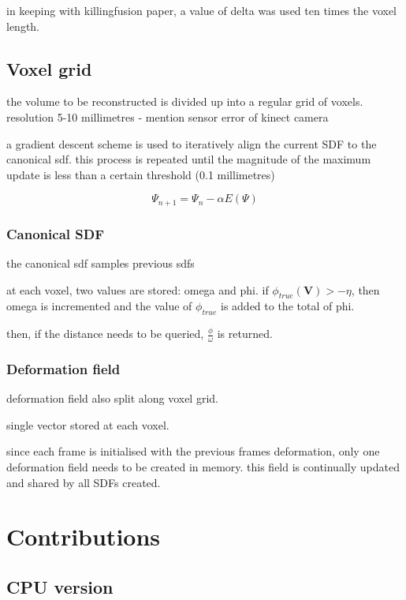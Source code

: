\documentclass[12pt,twoside]{report}
\begin{document}
in keeping with killingfusion paper, a value of delta was used ten times the voxel length.


\section{Voxel grid}

the volume to be reconstructed is divided up into a regular grid of voxels. resolution 5-10 millimetres - mention sensor error of kinect camera

a gradient descent scheme is used to iteratively align the current SDF to the canonical sdf. this process is repeated until the magnitude of the maximum update is less than a certain threshold (0.1 millimetres)

$$\Psi_{n+1} = \Psi_n - \alpha E(\Psi)$$

\subsection{Canonical SDF}

the canonical sdf samples previous sdfs

at each voxel, two values are stored: omega and phi.
if $\phi_{true}(\textbf{V}) > - \eta$, then omega is incremented and the value of $\phi_{true}$ is added to the total of phi.

then, if the distance needs to be queried, $\frac{\phi}{\omega}$ is returned.

\subsection{Deformation field}

deformation field also split along voxel grid.

single vector stored at each voxel.

since each frame is initialised with the previous frames deformation, only one deformation field needs to be created in memory. this field is continually updated and shared by all SDFs created.


\chapter{Contributions}


\section{CPU version}
\end{document}
